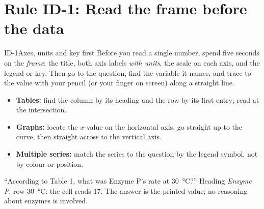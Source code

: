\documentclass[11pt]{article}
\begin{document}
\maketitleblock

\begin{abstract}
Interpretation of Data (IOD) is the largest reporting category on ACT Science: roughly 15--19 of the 40 questions ask you to read a value, name a trend, estimate between or beyond plotted points, link two figures, or do a few seconds of arithmetic on what you read. None of it needs outside science. Every IOD question is answered by a number or a direction that is already printed on the page; the skill is finding it fast and not misreading it. This guide breaks IOD into seven rules, each with a method, a worked example, the trap ACT sets most often, and a drill on an original passage. A mixed passage at the end tests all seven together. Work untimed the first time, then redo the drills against the clock (about 60 seconds per question).
\end{abstract}

\scoringline

\tableofcontents
\clearpage

\section{Rule ID-1: Read the frame before the data}

\begin{rulebox}{ID-1}{Axes, units and key first}
Before you read a single number, spend five seconds on the \emph{frame}: the title, both axis labels \emph{with units}, the scale on each axis, and the legend or key. Then go to the question, find the variable it names, and trace to the value with your pencil (or your finger on screen) along a straight line.
\begin{itemize}
\item \textbf{Tables:} find the column by its heading and the row by its first entry; read at the intersection.
\item \textbf{Graphs:} locate the $x$-value on the horizontal axis, go straight up to the curve, then straight across to the vertical axis.
\item \textbf{Multiple series:} match the series to the question by the legend symbol, not by colour or position.
\end{itemize}
\end{rulebox}

\begin{workedex}
``According to Table 1, what was Enzyme P's rate at \SI{30}{\celsius}?'' Heading \emph{Enzyme P}, row \SI{30}{\celsius}: the cell reads 17. The answer is the printed value; no reasoning about enzymes is involved.
\end{workedex}
\end{document}
